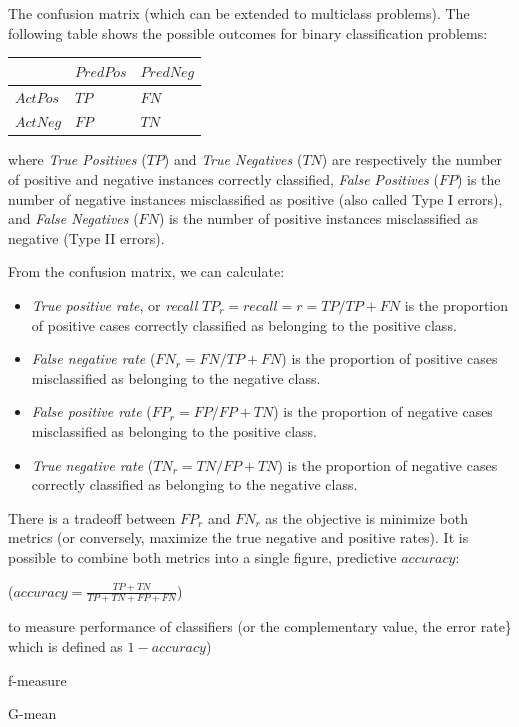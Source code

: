 \documentclass[]{book}
\providecommand{\tightlist}{%
  \setlength{\itemsep}{0pt}\setlength{\parskip}{0pt}}
\theoremstyle{definition}
\theoremstyle{definition}
\theoremstyle{remark}
\begin{document}
{The confusion matrix (which can be extended to multiclass problems). The
following table shows the possible outcomes for binary classification
problems:

\begin{longtable}[]{@{}lll@{}}
\toprule
& \(Pred Pos\) & \(Pred Neg\)\tabularnewline
\midrule
\endhead
\(Act Pos\) & \(TP\) & \(FN\)\tabularnewline
\(Act Neg\) & \(FP\) & \(TN\)\tabularnewline
\bottomrule
\end{longtable}

where \emph{True Positives} (\(TP\)) and \emph{True Negatives} (\(TN\))
are respectively the number of positive and negative instances correctly
classified, \emph{False Positives} (\(FP\)) is the number of negative
instances misclassified as positive (also called Type I errors), and
\emph{False Negatives} (\(FN\)) is the number of positive instances
misclassified as negative (Type II errors).

From the confusion matrix, we can calculate:

\begin{itemize}
\tightlist
\item
  \emph{True positive rate}, or \emph{recall }
  \(TP_r = recall = r = TP/TP+FN\) is the proportion of positive cases
  correctly classified as belonging to the positive class.
\item
  \emph{False negative rate} (\(FN_r=FN/TP+FN\)) is the proportion of
  positive cases misclassified as belonging to the negative class.
\item
  \emph{False positive rate} (\(FP_r=FP/FP+TN\)) is the proportion of
  negative cases misclassified as belonging to the positive class.
\item
  \emph{True negative rate} (\(TN_r=TN/FP+TN\)) is the proportion of
  negative cases correctly classified as belonging to the negative
  class.
\end{itemize}

There is a tradeoff between \(FP_r\) and \(FN_r\) as the objective is
minimize both metrics (or conversely, maximize the true negative and
positive rates). It is possible to combine both metrics into a single
figure, predictive \(accuracy\):

(\(accuracy = \frac{TP + TN}{TP + TN + FP + FN}\))

to measure performance of classifiers (or the complementary value, the
error rate\} which is defined as \(1-accuracy\))

f-measure

G-mean

}
\end{document}
